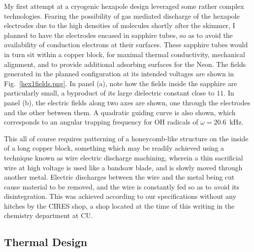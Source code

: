 My first attempt at a cryogenic hexapole design leveraged some rather complex technologies.
Fearing the possibility of gas mediated discharge of the hexapole electrodes due to the high densities of molecules shortly after the skimmer, I planned to have the electrodes encased in sapphire tubes, so as to avoid the availability of conduction electrons at their surfaces.
These sapphire tubes would in turn sit within a copper block, for maximal thermal conductivity, mechanical alignment, and to provide additional adsorbing surfaces for the Neon.
The fields generated in the planned configuration at its intended voltages are shown in Fig.~\ref{hex1fields.png}.
In panel (a), note how the fields inside the sapphire are particularly small, a byproduct of its large dielectric constant close to $11$.
In panel (b), the electric fields along two axes are shown, one through the electrodes and the other between them.
A quadratic guiding curve is also shown, which corresponds to an angular trapping frequency for OH radicals of $\omega=20.6$~kHz.


This all of course requires patterning of a honeycomb-like structure on the inside of a long copper block, something which may be readily achieved using a technique known as wire electric discharge machining, wherein a thin sacrificial wire at high voltage is used like a bandsaw blade, and is slowly moved through another metal.
Electric discharges between the wire and the metal being cut cause material to be removed, and the wire is constantly fed so as to avoid its disintegration.
This was achieved according to our specifications without any hitches by the CIRES shop, a shop located at the time of this writing in the chemistry department at CU.

\subsection{Thermal Design}

